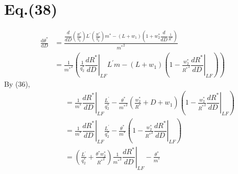 \documentclass[a4paper,11pt]{article}
\begin{document}
\section{Eq.(38)}
	\begin{align*}
		\frac{\mathrm{d}\theta^*}{\mathrm{d}D} &= \frac{\dfrac{d}{dD}\left( \frac{R^*}{q_2^*} \right)L^{'}\left( \frac{R^*}{q_2^*} \right)m^* - (L+w_1)\left( 1 + w_2^*\dfrac{d}{dD}\frac{1}{R^*} \right)}{{m^*}^2}\\[8pt]
		&= \frac{1}{{m^*}^2} \left( \frac{1}{q_2^*} \left. \dfrac{dR^*}{dD} \right|_{LF} L^{'} m - (L + w_1)\left(1 - \frac{w_2^*}{{R^*}^2} \left. \dfrac{dR^*}{dD} \right|_{LF} \right) \right)
	\end{align*}
	By (36),
	\begin{align*}
		\qquad \qquad &= \frac{1}{m^*} \left. \dfrac{dR^*}{dD} \right|_{LF} \frac{L^{'}}{q_2^*} - \frac{\theta^*}{{m^*}^2} \left( \frac{w_2^*}{R^*} + D + w_1 \right)\left( 1 - \frac{w_2^*}{{R^*}^2} \left. \dfrac{dR^*}{dD} \right|_{LF} \right)\\[8pt]
		&=  \frac{1}{m^*} \left. \dfrac{dR^*}{dD} \right|_{LF} \frac{L^{'}}{q_2^*} - \frac{\theta^*}{m^*} \left( 1 - \frac{w_2^*}{{R^*}^2} \left. \dfrac{dR^*}{dD} \right|_{LF} \right)\\[8pt]
		&= \left( \frac{L^{'}}{q_2^*} + \frac{\theta^* w_2^*}{{R^*}^2} \right)\frac{1}{{m^*}^2} \left. \dfrac{dR^*}{dD} \right|_{LF} - \frac{\theta^*}{m^*}
	\end{align*}
\end{document}
